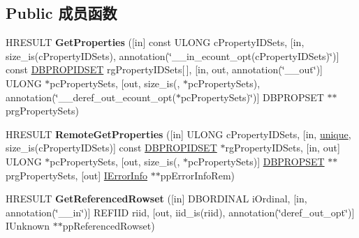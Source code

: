 \subsection*{Public 成员函数}
\begin{DoxyCompactItemize}
\item 
\mbox{\label{interface_i_rowset_info_aec74fcd858857d734bdf521b9762b503}} 
H\+R\+E\+S\+U\+LT {\bfseries Get\+Properties} (\mbox{[}in\mbox{]} const U\+L\+O\+NG c\+Property\+I\+D\+Sets, \mbox{[}in, size\+\_\+is(c\+Property\+I\+D\+Sets), annotation(\char`\"{}\+\_\+\+\_\+in\+\_\+ecount\+\_\+opt(c\+Property\+I\+D\+Sets)\char`\"{})\mbox{]} const \hyperlink{structtag_d_b_p_r_o_p_i_d_s_e_t}{D\+B\+P\+R\+O\+P\+I\+D\+S\+ET} rg\+Property\+I\+D\+Sets\mbox{[}$\,$\mbox{]}, \mbox{[}in, out, annotation(\char`\"{}\+\_\+\+\_\+out\char`\"{})\mbox{]} U\+L\+O\+NG $\ast$pc\+Property\+Sets, \mbox{[}out, size\+\_\+is(, $\ast$pc\+Property\+Sets), annotation(\char`\"{}\+\_\+\+\_\+deref\+\_\+out\+\_\+ecount\+\_\+opt($\ast$pc\+Property\+Sets)\char`\"{})\mbox{]} D\+B\+P\+R\+O\+P\+S\+ET $\ast$$\ast$prg\+Property\+Sets)
\item 
\mbox{\label{interface_i_rowset_info_ab120948c0293eee9c1787334f133b685}} 
H\+R\+E\+S\+U\+LT {\bfseries Remote\+Get\+Properties} (\mbox{[}in\mbox{]} U\+L\+O\+NG c\+Property\+I\+D\+Sets, \mbox{[}in, \hyperlink{interfaceunique}{unique}, size\+\_\+is(c\+Property\+I\+D\+Sets)\mbox{]} const \hyperlink{structtag_d_b_p_r_o_p_i_d_s_e_t}{D\+B\+P\+R\+O\+P\+I\+D\+S\+ET} $\ast$rg\+Property\+I\+D\+Sets, \mbox{[}in, out\mbox{]} U\+L\+O\+NG $\ast$pc\+Property\+Sets, \mbox{[}out, size\+\_\+is(, $\ast$pc\+Property\+Sets)\mbox{]} \hyperlink{structtag_d_b_p_r_o_p_s_e_t}{D\+B\+P\+R\+O\+P\+S\+ET} $\ast$$\ast$prg\+Property\+Sets, \mbox{[}out\mbox{]} \hyperlink{interface_i_error_info}{I\+Error\+Info} $\ast$$\ast$pp\+Error\+Info\+Rem)
\item 
\mbox{\label{interface_i_rowset_info_a46d6baae79f88fb0f726082239a3db2d}} 
H\+R\+E\+S\+U\+LT {\bfseries Get\+Referenced\+Rowset} (\mbox{[}in\mbox{]} D\+B\+O\+R\+D\+I\+N\+AL i\+Ordinal, \mbox{[}in, annotation(\char`\"{}\+\_\+\+\_\+in\char`\"{})\mbox{]} R\+E\+F\+I\+ID riid, \mbox{[}out, iid\+\_\+is(riid), annotation(\char`\"{}deref\+\_\+out\+\_\+opt\char`\"{})\mbox{]} I\+Unknown $\ast$$\ast$pp\+Referenced\+Rowset)
\item 
\mbox{\label{interface_i_rowset_info_ac2b69fe2c7a5a7513aabeea1a27fe860}} 

\end{DoxyCompactItemize}
